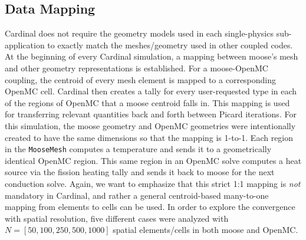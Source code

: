 \documentclass[letterpaper]{mc2023}
\begin{document}
\subsection{Data Mapping}
Cardinal does not require the geometry models used in each single-physics sub-application to exactly match the meshes/geometry used in
other coupled codes. At the beginning of every Cardinal simulation, a mapping between \gls{moose}'s mesh and other geometry representations
is established. For a \gls{moose}-OpenMC coupling, the centroid of every mesh element is mapped to a corresponding OpenMC cell. Cardinal
then creates a tally for every user-requested type in each of the regions of OpenMC that a \gls{moose} centroid falls in. This mapping is
used for transferring relevant quantities back and forth between Picard iterations. For this simulation, the \gls{moose} geometry and OpenMC
geometries were intentionally created to have the same dimensions so that the mapping is 1-to-1. Each region in the \texttt{MooseMesh}
computes a temperature and sends it to a geometrically identical OpenMC region. This same region in an OpenMC solve computes a heat source
via the fission heating tally and sends it back to \gls{moose} for the next conduction solve. Again, we want to emphasize that this strict
1:1 mapping is {\it not} mandatory in Cardinal, and rather a general centroid-based many-to-one mapping from elements to cells can be used.
In order to explore the convergence with spatial resolution, five different cases were analyzed with $N=[50, 100, 250, 500, 1000]$ spatial
elements/cells in both \gls{moose} and OpenMC.
\end{document}
